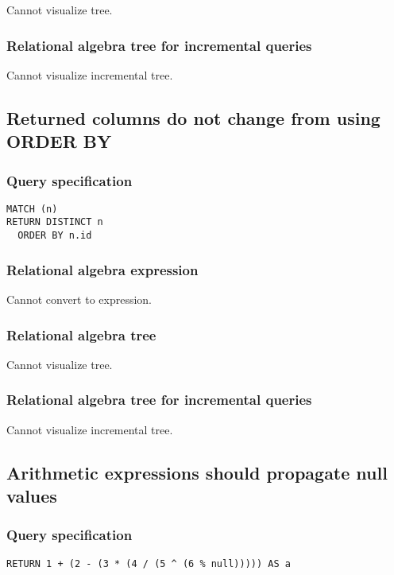 Cannot visualize tree.

\subsubsection*{Relational algebra tree for incremental queries}

Cannot visualize incremental tree.

\subsection{Returned columns do not change from using ORDER BY}

\subsubsection*{Query specification}

\begin{lstlisting}
MATCH (n)
RETURN DISTINCT n
  ORDER BY n.id
\end{lstlisting}

\subsubsection*{Relational algebra expression}

Cannot convert to expression.

\subsubsection*{Relational algebra tree}

Cannot visualize tree.

\subsubsection*{Relational algebra tree for incremental queries}

Cannot visualize incremental tree.

\subsection{Arithmetic expressions should propagate null values}

\subsubsection*{Query specification}

\begin{lstlisting}
RETURN 1 + (2 - (3 * (4 / (5 ^ (6 % null))))) AS a
\end{lstlisting}


